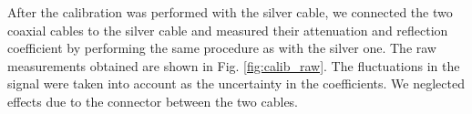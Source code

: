 \documentclass[a4paper]{report}
\numberwithin{equation}{section}
\begin{document}
After the calibration was performed with the silver cable, we connected the two
coaxial cables to the silver cable and measured their attenuation and reflection
coefficient by performing the same procedure as with the silver one. The raw
measurements obtained are shown in Fig.  \ref{fig:calib_raw}. The fluctuations in the signal were taken into account as the
uncertainty in the coefficients. We neglected effects due to the connector
between the two cables.

\begin{figure}[htb!]
	\centering
	\quad
	\quad
	\quad


\end{figure}
\end{document}
